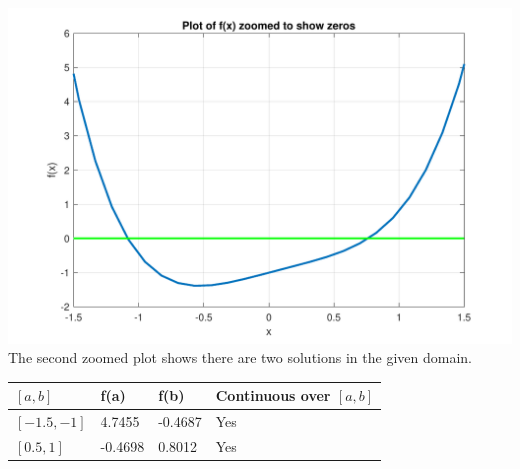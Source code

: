 \documentclass[a4paper,11pt]{article}
\begin{document}
\begin{enumerate}
\begin{enumerate}
{			\includegraphics[scale=0.5]{images/Q1a_i_zoomed.pdf}
		}
			The second zoomed plot shows there are two solutions in the 
			given domain.
			\begin{center}
				\begin{tabular}{l|lll}
					$[a,b]$     & f(a)    & f(b)    & Continuous over $[a,b]$ 
					\\ \hline
					$[-1.5,-1]$ & 4.7455  & -0.4687 & Yes                     
					\\
					$[0.5,1]$   & -0.4698 & 0.8012  & Yes                    
				\end{tabular}
			\end{center}
			

\end{enumerate}
\end{enumerate}
\end{document}

